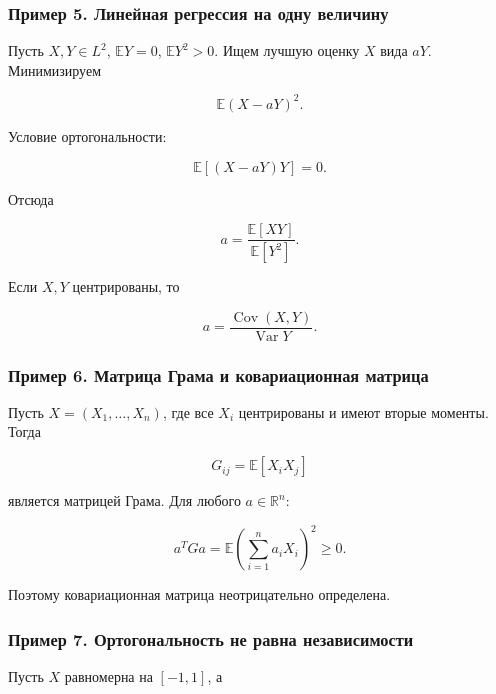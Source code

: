 \documentclass[
  11pt,
  a4paper,
]{article}
\begin{document}
\subsubsection{Пример 5. Линейная регрессия на одну
величину}\label{ux43fux440ux438ux43cux435ux440-5.-ux43bux438ux43dux435ux439ux43dux430ux44f-ux440ux435ux433ux440ux435ux441ux441ux438ux44f-ux43dux430-ux43eux434ux43dux443-ux432ux435ux43bux438ux447ux438ux43dux443}

Пусть \(X,Y\in L^2\), \(\mathbb EY=0\), \(\mathbb EY^2>0\). Ищем лучшую
оценку \(X\) вида \(aY\). Минимизируем

\[
\mathbb E(X-aY)^2.
\]

Условие ортогональности:

\[
\mathbb E[(X-aY)Y]=0.
\]

Отсюда

\[
a=\frac{\mathbb E[XY]}{\mathbb E[Y^2]}.
\]

Если \(X,Y\) центрированы, то

\[
a=\frac{\operatorname{Cov}(X,Y)}{\operatorname{Var}Y}.
\]

\subsubsection{Пример 6. Матрица Грама и ковариационная
матрица}\label{ux43fux440ux438ux43cux435ux440-6.-ux43cux430ux442ux440ux438ux446ux430-ux433ux440ux430ux43cux430-ux438-ux43aux43eux432ux430ux440ux438ux430ux446ux438ux43eux43dux43dux430ux44f-ux43cux430ux442ux440ux438ux446ux430}

Пусть \(X=(X_1,\ldots,X_n)\), где все \(X_i\) центрированы и имеют
вторые моменты. Тогда

\[
G_{ij}=\mathbb E[X_iX_j]
\]

является матрицей Грама. Для любого \(a\in\mathbb R^n\):

\[
a^TGa
=
\mathbb E\left(\sum_{i=1}^n a_iX_i\right)^2
\ge0.
\]

Поэтому ковариационная матрица неотрицательно определена.

\subsubsection{Пример 7. Ортогональность не равна
независимости}\label{ux43fux440ux438ux43cux435ux440-7.-ux43eux440ux442ux43eux433ux43eux43dux430ux43bux44cux43dux43eux441ux442ux44c-ux43dux435-ux440ux430ux432ux43dux430-ux43dux435ux437ux430ux432ux438ux441ux438ux43cux43eux441ux442ux438}

Пусть \(X\) равномерна на \([-1,1]\), а
\end{document}
